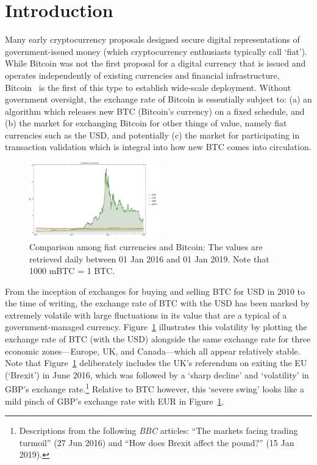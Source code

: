 
\section{Introduction}\label{sec:Intro}

Many early cryptocurrency proposals designed secure digital representations of government-issued money (which cryptocurrency enthusiasts typically call `fiat'). While Bitcoin was not the first proposal for a digital currency that is issued and operates independently of existing currencies and financial infrastructure, Bitcoin~\cite{nakamoto2008bitcoin} is the first of this type to establish wide-scale deployment. Without government oversight, the exchange rate of Bitcoin is essentially subject to: (a) an algorithm which releases new BTC (Bitcoin's currency) on a fixed schedule, and (b) the market for exchanging Bitcoin for other things of value, namely fiat currencies such as the USD, and potentially (c) the market for participating in transaction validation which is integral into how new BTC comes into circulation.

\begin{figure}[t]
	\centering
	\includegraphics[width=0.5\textwidth]{figures/allCurrencies.pdf}
	\caption{\label{fig:btcandfiat}Comparison among fiat currencies and Bitcoin: The values are retrieved daily between  01 Jan 2016 and 01 Jan 2019. Note that 1000 mBTC = 1 BTC.}
\end{figure}

From the inception of exchanges for buying and selling BTC for USD in 2010 to the time of writing, the exchange rate of BTC with the USD has been marked by extremely volatile with large fluctuations in its value that are a typical of a government-managed currency. Figure~\ref{fig:btcandfiat} illustrates this volatility by plotting the exchange rate of BTC (with the USD) alongside the same exchange rate for three economic zones---Europe, UK, and Canada---which all appear relatively stable. Note that Figure~\ref{fig:btcandfiat} deliberately includes the UK's referendum on exiting the EU (`Brexit') in June 2016, which was followed by a `sharp decline' and `volatility' in GBP's exchange rate.\footnote{Descriptions from the following \textit{BBC} articles: ``The markets facing trading turmoil'' (27 Jun 2016) and ``How does Brexit affect the pound?'' (15 Jan 2019).}  Relative to BTC however, this `severe swing' looks like a mild pinch of GBP's exchange rate with EUR in Figure~\ref{fig:btcandfiat}.


